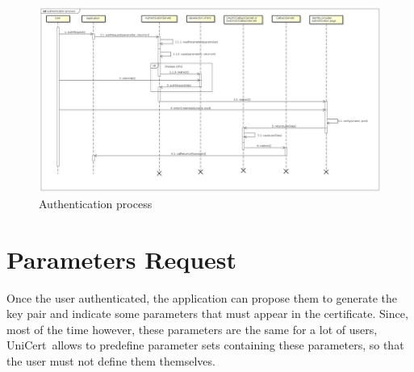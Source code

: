 \documentclass[oneside]{scrreprt}
\newcommand{\unicert}{\mbox{UniCert}}
\begin{document}
\begin{figure}[ht]
\centerline{
\includegraphics[width=1.0\textwidth]{figs/authentication_process}}
\caption{Authentication process}
\label{fig:auth_process}
\end{figure}


\section{Parameters Request}\label{sec:param_request}

Once the user authenticated, the application can propose them to generate the key pair and indicate some parameters that must appear in the certificate. Since, most of the time however, these parameters are the same for a lot of users, \unicert\ allows to predefine parameter sets containing these parameters, so that the user must not define them themselves.
\end{document}
